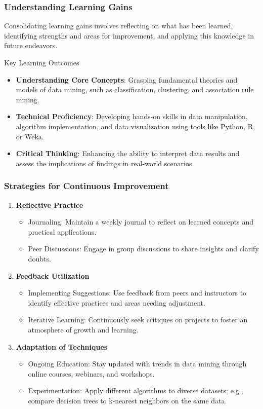 \documentclass{beamer}
\begin{document}
\begin{frame}[fragile]
    \frametitle{Understanding Learning Gains}
    Consolidating learning gains involves reflecting on what has been learned, identifying strengths and areas for improvement, and applying this knowledge in future endeavors.

    \begin{block}{Key Learning Outcomes}
        \begin{itemize}
            \item \textbf{Understanding Core Concepts}: Grasping fundamental theories and models of data mining, such as classification, clustering, and association rule mining.
            \item \textbf{Technical Proficiency}: Developing hands-on skills in data manipulation, algorithm implementation, and data visualization using tools like Python, R, or Weka.
            \item \textbf{Critical Thinking}: Enhancing the ability to interpret data results and assess the implications of findings in real-world scenarios.
        \end{itemize}
    \end{block}
\end{frame}

\begin{frame}[fragile]
    \frametitle{Strategies for Continuous Improvement}
    \begin{enumerate}
        \item \textbf{Reflective Practice}
            \begin{itemize}
                \item Journaling: Maintain a weekly journal to reflect on learned concepts and practical applications.
                \item Peer Discussions: Engage in group discussions to share insights and clarify doubts.
            \end{itemize}
        \item \textbf{Feedback Utilization}
            \begin{itemize}
                \item Implementing Suggestions: Use feedback from peers and instructors to identify effective practices and areas needing adjustment.
                \item Iterative Learning: Continuously seek critiques on projects to foster an atmosphere of growth and learning.
            \end{itemize}
        \item \textbf{Adaptation of Techniques}
            \begin{itemize}
                \item Ongoing Education: Stay updated with trends in data mining through online courses, webinars, and workshops.
                \item Experimentation: Apply different algorithms to diverse datasets; e.g., compare decision trees to k-nearest neighbors on the same data.
            \end{itemize}
    \end{enumerate}
\end{frame}
\end{document}
